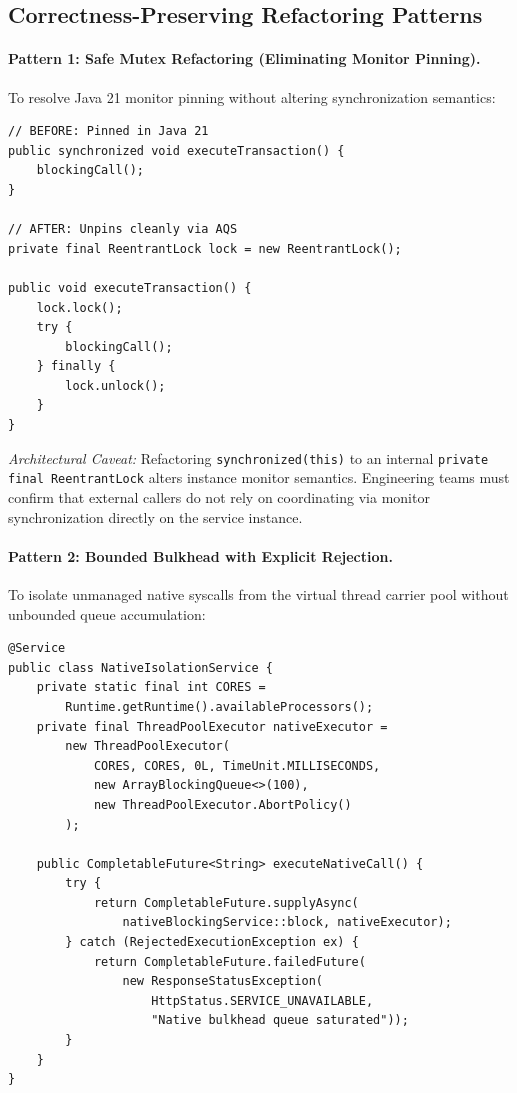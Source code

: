 \subsection{Correctness-Preserving Refactoring Patterns}

\paragraph{Pattern 1: Safe Mutex Refactoring (Eliminating Monitor Pinning).}
To resolve Java 21 monitor pinning without altering synchronization semantics:
\begin{verbatim}
// BEFORE: Pinned in Java 21
public synchronized void executeTransaction() {
    blockingCall();
}

// AFTER: Unpins cleanly via AQS
private final ReentrantLock lock = new ReentrantLock();

public void executeTransaction() {
    lock.lock();
    try {
        blockingCall();
    } finally {
        lock.unlock();
    }
}
\end{verbatim}
\textit{Architectural Caveat:} Refactoring \texttt{synchronized(this)} to an internal \texttt{private final ReentrantLock} alters instance monitor semantics. Engineering teams must confirm that external callers do not rely on coordinating via monitor synchronization directly on the service instance.

\paragraph{Pattern 2: Bounded Bulkhead with Explicit Rejection.}
To isolate unmanaged native syscalls from the virtual thread carrier pool without unbounded queue accumulation:
\begin{verbatim}
@Service
public class NativeIsolationService {
    private static final int CORES =
        Runtime.getRuntime().availableProcessors();
    private final ThreadPoolExecutor nativeExecutor =
        new ThreadPoolExecutor(
            CORES, CORES, 0L, TimeUnit.MILLISECONDS,
            new ArrayBlockingQueue<>(100),
            new ThreadPoolExecutor.AbortPolicy()
        );

    public CompletableFuture<String> executeNativeCall() {
        try {
            return CompletableFuture.supplyAsync(
                nativeBlockingService::block, nativeExecutor);
        } catch (RejectedExecutionException ex) {
            return CompletableFuture.failedFuture(
                new ResponseStatusException(
                    HttpStatus.SERVICE_UNAVAILABLE,
                    "Native bulkhead queue saturated"));
        }
    }
}
\end{verbatim}

